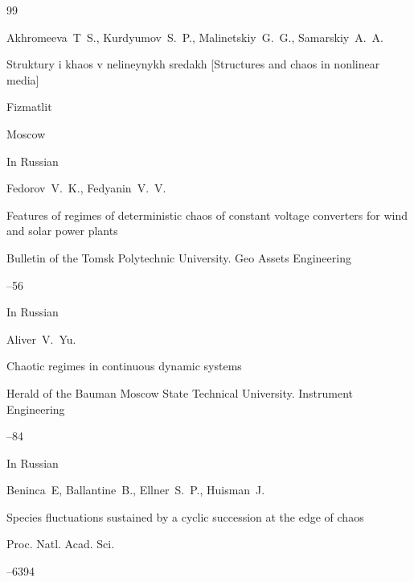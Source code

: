 \begin{thebibliography}{99}

	


\by Akhromeeva~T~S., Kurdyumov~S.~P., Malinetskiy~G.~G., Samarskiy~A.~A.

\book Struktury i khaos v nelineynykh sredakh \rm [Structures and chaos in nonlinear media]


\publ Fizmatlit

\publaddr Moscow

\lang In Russian





\by Fedorov~V.~K., Fedyanin~V.~V.

\paper Features of regimes of deterministic chaos of constant voltage converters for wind and solar power plants

\jour Bulletin of the Tomsk Polytechnic University. Geo Assets Engineering




--56

\lang In Russian




\by Aliver~V.~Yu.

\paper Chaotic regimes in continuous dynamic systems

\jour Herald of the Bauman Moscow State Technical University. Instrument Engineering



--84

\lang In Russian




\by Beninca~E, Ballantine~B., Ellner~S.~P., Huisman~J. 

\paper Species fluctuations sustained by a cyclic succession at the edge of chaos

\jour Proc. Natl. Acad. Sci. 




--6394


\end{thebibliography}

